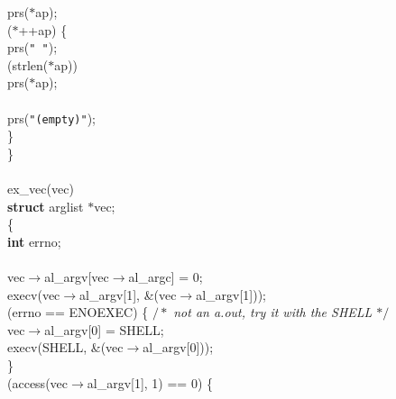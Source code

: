 \begin{flushleft}
\hspace*{3\indentation}prs($\ast$ap);\mbox{}\\
\hspace*{3\indentation}{\bf while} ($\ast$++ap) \{\mbox{}\\
\hspace*{6\indentation}prs({\tt" "});\mbox{}\\
\hspace*{6\indentation}{\bf if} (strlen($\ast$ap))\mbox{}\\
\hspace*{9\indentation}prs($\ast$ap);\mbox{}\\
\hspace*{6\indentation}{\bf else}\mbox{}\\
\hspace*{9\indentation}prs({\tt"(empty)"});\mbox{}\\
\hspace*{3\indentation}\}\mbox{}\\
\}\mbox{}\\
\mbox{}\\
ex\_vec(vec)\mbox{}\\
\hspace*{3\indentation}{\bf register} {\bf struct} arglist $\ast$vec;\mbox{}\\
\{\mbox{}\\
\hspace*{3\indentation}{\bf extern} {\bf int} errno;\mbox{}\\
\mbox{}\\
\hspace*{3\indentation}vec$\rightarrow$al\_argv[vec$\rightarrow$al\_argc] = 0;\mbox{}\\
\hspace*{3\indentation}execv(vec$\rightarrow$al\_argv[1], \&(vec$\rightarrow$al\_argv[1]));\mbox{}\\
\hspace*{3\indentation}{\bf if} (errno == ENOEXEC) \{ {$/\ast$\it{} not an a.out, try it with the SHELL $\ast/$}\mbox{}\\
\hspace*{6\indentation}vec$\rightarrow$al\_argv[0] = SHELL;\mbox{}\\
\hspace*{6\indentation}execv(SHELL, \&(vec$\rightarrow$al\_argv[0]));\mbox{}\\
\hspace*{3\indentation}\}\mbox{}\\
\hspace*{3\indentation}{\bf if} (access(vec$\rightarrow$al\_argv[1], 1) == 0) \{\mbox{}\\

\end{flushleft}
